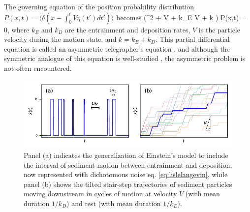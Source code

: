 The governing equation of the position probability distribution $P(x,t) = \langle \delta(x-\int_0^t V\eta(t')dt') \rangle$ becomes \citep{Balakrishnan1993}
\be \big(\pt^2 + V \px \pt + k_E V \px + k \pt \big) P(x,t) = 0,\label{eq:lislemaster}\ee
where $k_E$ and $k_D$ are the entrainment and deposition rates, $V$ is the particle velocity during the motion state, and $k = k_E+k_D$. This partial differential equation is called an asymmetric telegrapher's equation \citep{Rossetto2018}, and although the symmetric analogue of this equation is well-studied \citep{Weiss2002a, Masoliver2017}, the asymmetric problem is not often encountered.
\begin{figure}[!htbp]
	\includegraphics[width=\linewidth,keepaspectratio]{./figures/ch1/lisleConcept.pdf}
	\caption{Panel (a) indicates the generalization of Einstein's model to include the interval of sediment motion between entrainment and deposition, now represented with dichotomous noise eq. \ref{eq:lislelangevin}, while panel (b) shows the tilted stair-step trajectories of sediment particles moving downstream in cycles of motion at velocity $V$ (with mean duration $1/k_D$) and rest (with mean duration $1/k_E$). }
	\label{fig:lislefig}
\end{figure}

